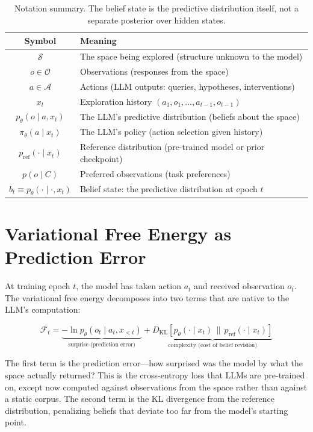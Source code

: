 \documentclass[11pt]{article}
\newcommand{\VFE}{\mathcal{F}}
\newcommand{\KL}[2]{D_{\mathrm{KL}}\!\left[#1 \,\|\, #2\right]}
\begin{document}
\begin{table}[h]
\centering
\begin{tabular}{@{}cl@{}}
\toprule
\textbf{Symbol} & \textbf{Meaning} \\
\midrule
$\mathcal{S}$ & The space being explored (structure unknown to the model) \\
$o \in \mathcal{O}$ & Observations (responses from the space) \\
$a \in \mathcal{A}$ & Actions (LLM outputs: queries, hypotheses, interventions) \\
$x_t$ & Exploration history $(a_1, o_1, \ldots, a_{t-1}, o_{t-1})$ \\
$p_\theta(o \mid a, x_t)$ & The LLM's predictive distribution (beliefs about the space) \\
$\pi_\theta(a \mid x_t)$ & The LLM's policy (action selection given history) \\
$p_{\mathrm{ref}}(\cdot \mid x_t)$ & Reference distribution (pre-trained model or prior checkpoint) \\
$p(o \mid C)$ & Preferred observations (task preferences) \\
$b_t \equiv p_\theta(\cdot \mid \cdot, x_t)$ & Belief state: the predictive distribution at epoch $t$ \\
\bottomrule
\end{tabular}
\caption{Notation summary. The belief state is the predictive distribution itself, not a separate posterior over hidden states.}
\label{tab:notation}
\end{table}


\section{Variational Free Energy as Prediction Error}
\label{sec:vfe}

At training epoch $t$, the model has taken action $a_t$ and received observation $o_t$. The variational free energy decomposes into two terms that are native to the LLM's computation:

\begin{equation}
\label{eq:vfe}
\VFE_t = \underbrace{-\ln p_\theta(o_t \mid a_t, x_{<t})}_{\text{surprise (prediction error)}} + \underbrace{\KL{p_\theta(\cdot \mid x_t)}{p_{\mathrm{ref}}(\cdot \mid x_t)}}_{\text{complexity (cost of belief revision)}}
\end{equation}

The first term is the prediction error---how surprised was the model by what the space actually returned? This is the cross-entropy loss that LLMs are pre-trained on, except now computed against observations from the space rather than against a static corpus. The second term is the KL divergence from the reference distribution, penalizing beliefs that deviate too far from the model's starting point.
\end{document}
